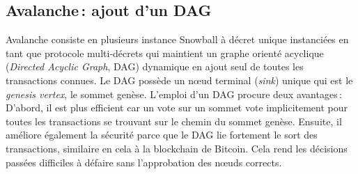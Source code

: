 \subsection{Avalanche\,: ajout d'un DAG}%

Avalanche consiste en plusieurs instance Snowball à décret unique instanciées en tant que protocole multi-décrets qui maintient un graphe orienté acyclique (\emph{Directed Acyclic Graph},  DAG) dynamique en ajout seul de toutes les transactions connues.
Le DAG possède un nœud terminal (\emph{sink}) unique qui est le \emph{genesis vertex}, le sommet genèse.
L'emploi d'un DAG procure deux avantages\,:
D'abord, il est plus efficient car un vote sur un sommet vote implicitement pour toutes les transactions se trouvant sur le chemin du sommet genèse.
Ensuite, il améliore également la sécurité parce que le DAG lie fortement le sort des transactions, similaire en cela à la blockchain de Bitcoin.
Cela rend les décisions passées difficiles à défaire sans l'approbation des nœuds corrects.


